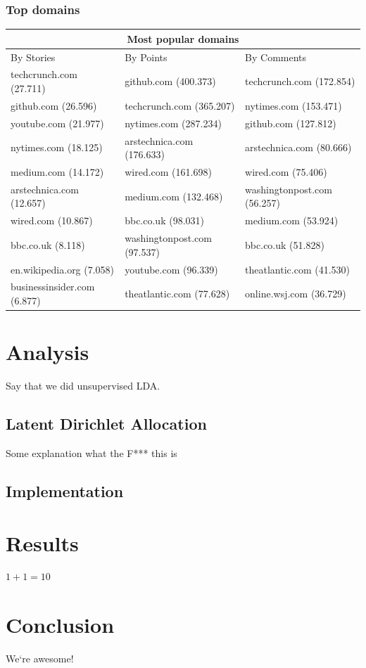 \subsubsection{Top domains}
\begin{center}
    \begin{tabular}{|p{4.5cm}|p{=5cm}|p{5cm}|}
        \hline
        \multicolumn{3}{|c|}{Most popular domains} \\
        \hline
        By Stories & By Points & By Comments \\
        \hline
       techcrunch.com (27.711) 	& github.com (400.373)		       & techcrunch.com (172.854) \\
		github.com (26.596) 			& techcrunch.com (365.207) 	   & nytimes.com (153.471) \\
		youtube.com (21.977) 		& nytimes.com (287.234)		   & github.com (127.812) \\
		nytimes.com (18.125) 		& arstechnica.com (176.633)	   & arstechnica.com (80.666) \\
		medium.com (14.172) 		& wired.com (161.698)		  	   & wired.com (75.406) \\
		arstechnica.com (12.657) 	& medium.com (132.468)		   & washingtonpost.com (56.257) \\
		wired.com (10.867) 			& bbc.co.uk (98.031)		  		   & medium.com (53.924) \\
		bbc.co.uk (8.118) 				& washingtonpost.com (97.537) & bbc.co.uk (51.828) \\
		en.wikipedia.org (7.058) 		& youtube.com (96.339)		  	   & theatlantic.com (41.530) \\
		businessinsider.com (6.877) & theatlantic.com (77.628)	   & online.wsj.com (36.729) \\
         \hline
    \end{tabular}
\end{center}

\section{Analysis}
Say that we did unsupervised LDA.

\subsection{Latent Dirichlet Allocation}
Some explanation what the F*** this is

\subsection{Implementation}

\section{Results}
$1+1=10$

\section{Conclusion}
We`re awesome!